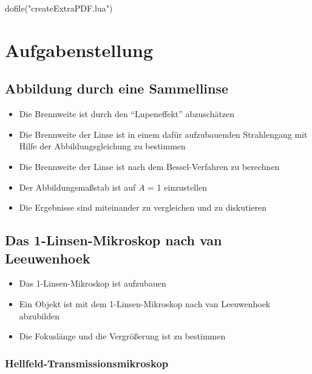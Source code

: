 \documentclass[12pt,english,ngerman]{scrartcl}
\begin{document}
\begin{luacode*}
dofile("createExtraPDF.lua")
\end{luacode*}

% 
\tableofcontents

\newpage

\section{Aufgabenstellung}\label{Auf}

\subsection{Abbildung durch eine Sammellinse}

\begin{itemize}
	\item Die Brennweite ist durch den ``Lupeneffekt'' abzuschätzen
	\item Die Brennweite der Linse ist in einem dafür aufzubauenden Strahlengang mit
	      Hilfe der Abbildungsgleichung zu bestimmen
	\item Die Brennweite der Linse ist nach dem Bessel-Verfahren zu berechnen
	\item Der Abbildungsmaßstab ist auf $A$ = 1 einzustellen
	\item Die Ergebnisse sind miteinander zu vergleichen und zu diskutieren
\end{itemize}

\subsection{Das 1-Linsen-Mikroskop nach van Leeuwenhoek}

\begin{itemize}
	\item Das 1-Linsen-Mikroskop ist aufzubauen
	\item Ein Objekt ist mit dem 1-Linsen-Mikroskop nach van Leeuwenhoek abzubilden
	\item Die Fokuslänge und die Vergrößerung ist zu bestimmen
\end{itemize}

\subsubsection{Hellfeld-Transmissionsmikroskop}
\end{document}
